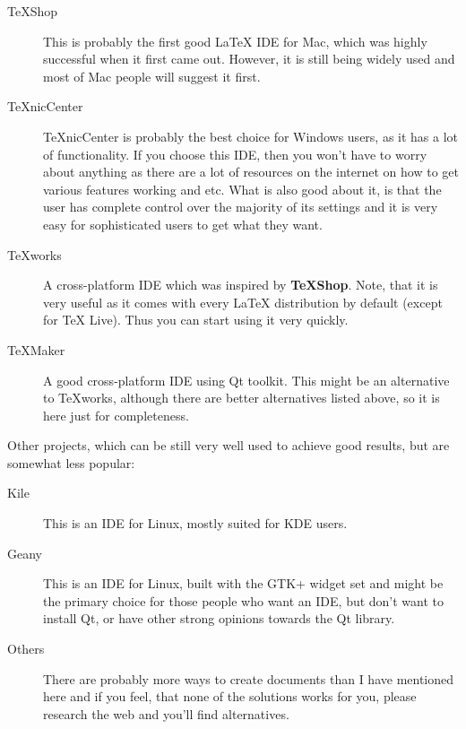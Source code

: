 \documentclass[
    draft
]{scrartcl}
\begin{document}
\begin{description}
    \item[TeXShop] 
        This is probably the first good \LaTeX{} IDE for Mac, which was highly
            successful when it first came out.
        However, it is still being widely used and most of Mac people will
            suggest it first.

    \item[\TeX{}nicCenter] 
        \TeX{}nicCenter is probably the best choice for Windows users, as it has
            a lot of functionality.
        If you choose this IDE, then you won't have to worry about anything as
            there are a lot of resources on the internet on how to get various
            features working and etc.
        What is also good about it, is that the user has complete control over
            the majority of its settings and it is very easy for sophisticated
            users to get what they want.

    \item[TeXworks]
        A cross-platform IDE which was inspired by \textbf{TeXShop}.
        Note, that it is very useful as it comes with every \LaTeX{}
            distribution by default (except for \TeX{} Live).
        Thus you can start using it very quickly.

    \item[TeXMaker]
        A good cross-platform IDE using Qt toolkit.
        This might be an alternative to TeXworks, although there are better
            alternatives listed above, so it is here just for completeness.
\end{description}

Other projects, which can be still very well used to achieve good results, but
    are somewhat less popular:
%
\begin{description}
    \item[Kile]
        This is an IDE for Linux, mostly suited for KDE users.
    \item[Geany]
        This is an IDE for Linux, built with the GTK+ widget set and might be
            the primary choice for those people who want an IDE, but don't want
            to install Qt, or have other strong opinions towards the Qt library.
    \item[Others]
        There are probably more ways to create  documents than I have
            mentioned here and if you feel, that none of the solutions works for
            you, please research the web and you'll find alternatives.
\end{description}
\end{document}
